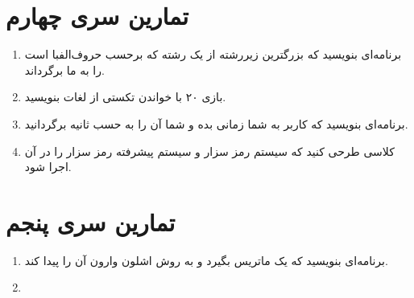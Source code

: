 \documentclass[12pt,a4paper]{article}
\newcommand{\ن}{‌}
\begin{document}
\section{تمارین سری چهارم}
\begin{enumerate}

\item
برنامه‌ای بنویسید که بزرگترین زیررشته از یک رشته که برحسب حروف‌الفبا است را به ما برگرداند.
\item
بازی ۲۰ با خواندن تکستی از لغات بنویسید.
\item 
برنامه‌ای بنویسید که کاربر به شما زمانی بده و شما آن را به حسب ثانیه برگردانید.
\item
کلاسی طرحی کنید که سیستم رمز سزار و سیستم پیشرفته رمز سزار را در آن اجرا شود.

\end{enumerate}

\section{تمارین سری پنجم}
\begin{enumerate}
\item
برنامه‌ای بنویسید که یک ماتریس بگیرد و به روش اشلون وارون آن را پیدا کند.
\item

\end{enumerate}


	
\end{document}
